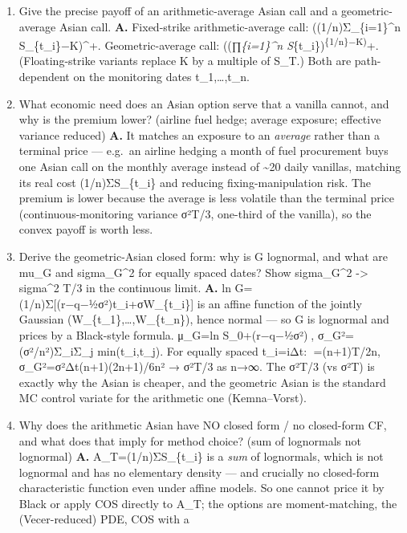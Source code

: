 \documentclass[
  11pt,
]{article}
\providecommand{\tightlist}{%
  \setlength{\itemsep}{0pt}\setlength{\parskip}{0pt}}
\begin{document}
\begin{enumerate}
\def\labelenumi{\arabic{enumi}.}
\tightlist
\item
  Give the precise payoff of an arithmetic-average Asian call and a
  geometric-average Asian call. \textbf{A.} Fixed-strike
  arithmetic-average call: ((1/n)Σ\_\{i=1\}\^{}n S\_\{t\_i\}−K)\^{}+.
  Geometric-average call: ((∏\emph{\{i=1\}\^{}n
  S}\{t\_i\})\textsuperscript{\{1/n\}−K)}+. (Floating-strike variants
  replace K by a multiple of S\_T.) Both are path-dependent on the
  monitoring dates t\_1,\ldots,t\_n.
\item
  What economic need does an Asian option serve that a vanilla cannot,
  and why is the premium lower? (airline fuel hedge; average exposure;
  effective variance reduced) \textbf{A.} It matches an exposure to an
  \emph{average} rather than a terminal price --- e.g.~an airline
  hedging a month of fuel procurement buys one Asian call on the monthly
  average instead of \textasciitilde20 daily vanillas, matching its real
  cost (1/n)ΣS\_\{t\_i\} and reducing fixing-manipulation risk. The
  premium is lower because the average is less volatile than the
  terminal price (continuous-monitoring variance σ²T/3, one-third of the
  vanilla), so the convex payoff is worth less.
\item
  Derive the geometric-Asian closed form: why is G lognormal, and what
  are mu\_G and sigma\_G\^{}2 for equally spaced dates? Show
  sigma\_G\^{}2 -\textgreater{} sigma\^{}2 T/3 in the continuous limit.
  \textbf{A.} ln G=(1/n)Σ{[}(r−q−½σ²)t\_i+σW\_\{t\_i\}{]} is an affine
  function of the jointly Gaussian (W\_\{t\_1\},\ldots,W\_\{t\_n\}),
  hence normal --- so G is lognormal and prices by a Black-style
  formula. μ\_G=ln S\_0+(r−q−½σ²), σ\_G²=(σ²/n²)Σ\_iΣ\_j
  min(t\_i,t\_j). For equally spaced t\_i=iΔt: =(n+1)T/2n,
  σ\_G²=σ²Δt(n+1)(2n+1)/6n² → σ²T/3 as n→∞. The σ²T/3 (vs σ²T) is
  exactly why the Asian is cheaper, and the geometric Asian is the
  standard MC control variate for the arithmetic one (Kemna--Vorst).
\item
  Why does the arithmetic Asian have NO closed form / no closed-form CF,
  and what does that imply for method choice? (sum of lognormals not
  lognormal) \textbf{A.} A\_T=(1/n)ΣS\_\{t\_i\} is a \emph{sum} of
  lognormals, which is not lognormal and has no elementary density ---
  and crucially no closed-form characteristic function even under affine
  models. So one cannot price it by Black or apply COS directly to A\_T;
  the options are moment-matching, the (Vecer-reduced) PDE, COS with a

\end{enumerate}
\end{document}
